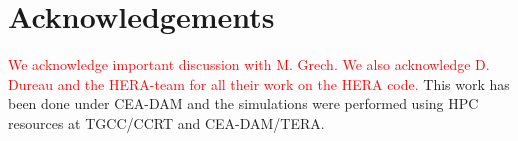 \documentclass[
 reprint,
 amsmath,amssymb,
 aps,
]{revtex4-1}
\begin{document}
\section*{Acknowledgements}
 \textcolor{red}{We acknowledge important discussion with M. Grech.  
 We also acknowledge D. Dureau and the HERA-team for all their work on the HERA code. }
This work has been done under   CEA-DAM and
the simulations were performed using HPC resources at TGCC/CCRT and CEA-DAM/TERA.

\end{document}
